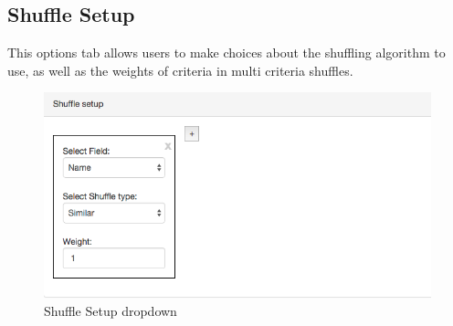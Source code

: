 \subsection{Shuffle Setup}\par
This options tab allows users to make choices about the shuffling algorithm to use, as well as the weights of criteria in multi criteria shuffles.\par
 \begin{figure}[H] 
	\centering
	\includegraphics[width=13cm]{./graphics/ShuffleSetup.jpg}\par
	\caption{Shuffle Setup dropdown}
\end{figure}

